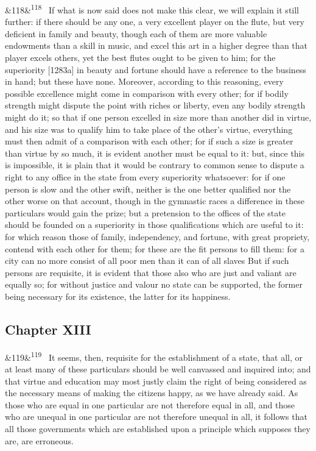 \documentclass[12pt]{article}
\newcommand{\para}[1][]{\par\noindent\ifx&#1&\else\textsuperscript{\footnotesize #1}~\fi}
\begin{document}
\para[118] If what is now said does not make this clear, we will explain it still further: if there should be any one, a very excellent player on the flute, but very deficient in family and beauty, though each of them are more valuable endowments than a skill in music, and excel this art in a higher degree than that player excels others, yet the best flutes ought to be given to him; for the superiority [1283a] in beauty and fortune should have a reference to the business in hand; but these have none. Moreover, according to this reasoning, every possible excellence might come in comparison with every other; for if bodily strength might dispute the point with riches or liberty, even any bodily strength might do it; so that if one person excelled in size more than another did in virtue, and his size was to qualify him to take place of the other's virtue, everything must then admit of a comparison with each other; for if such a size is greater than virtue by so much, it is evident another must be equal to it: but, since this is impossible, it is plain that it would be contrary to common sense to dispute a right to any office in the state from every superiority whatsoever: for if one person is slow and the other swift, neither is the one better qualified nor the other worse on that account, though in the gymnastic races a difference in these particulars would gain the prize; but a pretension to the offices of the state should be founded on a superiority in those qualifications which are useful to it: for which reason those of family, independency, and fortune, with great propriety, contend with each other for them; for these are the fit persons to fill them: for a city can no more consist of all poor men than it can of all slaves But if such persons are requisite, it is evident that those also who are just and valiant are equally so; for without justice and valour no state can be supported, the former being necessary for its existence, the latter for its happiness.

\subsection*{Chapter XIII}

\para[119] It seems, then, requisite for the establishment of a state, that all, or at least many of these particulars should be well canvassed and inquired into; and that virtue and education may most justly claim the right of being considered as the necessary means of making the citizens happy, as we have already said. As those who are equal in one particular are not therefore equal in all, and those who are unequal in one particular are not therefore unequal in all, it follows that all those governments which are established upon a principle which supposes they are, are erroneous.
\end{document}
